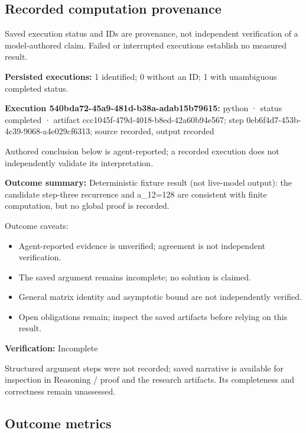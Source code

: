 \documentclass[11pt]{article}
\begin{document}
\subsection{Recorded computation provenance}
Saved execution status and IDs are provenance, not independent verification of a model-authored claim. Failed or interrupted executions establish no measured result.\par
\textbf{Persisted executions:} 1 identified; 0 without an ID; 1 with unambiguous completed status.\par
\textbf{Execution 540bda72-45a9-481d-b38a-adab15b79615:} python · status completed · artifact ccc1045f-479d-4018-b8ed-42a60b94e567; step 0eb6f4d7-453b-4c39-9068-a4e029cf6313; source recorded, output recorded\par
Authored conclusion below is agent-reported; a recorded execution does not independently validate its interpretation.\par
\textbf{Outcome summary:} Deterministic fixture result (not live-model output): the candidate step-three recurrence and a\_12=128 are consistent with finite computation, but no global proof is recorded.\par
Outcome caveats:\par
\begin{itemize}
\item Agent-reported evidence is unverified; agreement is not independent verification.
\item The saved argument remains incomplete; no solution is claimed.
\item General matrix identity and asymptotic bound are not independently verified.
\item Open obligations remain; inspect the saved artifacts before relying on this result.
\end{itemize}
\textbf{Verification:} Incomplete\par
Structured argument steps were not recorded; saved narrative is available for inspection in Reasoning / proof and the research artifacts. Its completeness and correctness remain unassessed.\par
\subsection{Outcome metrics}
\end{document}
